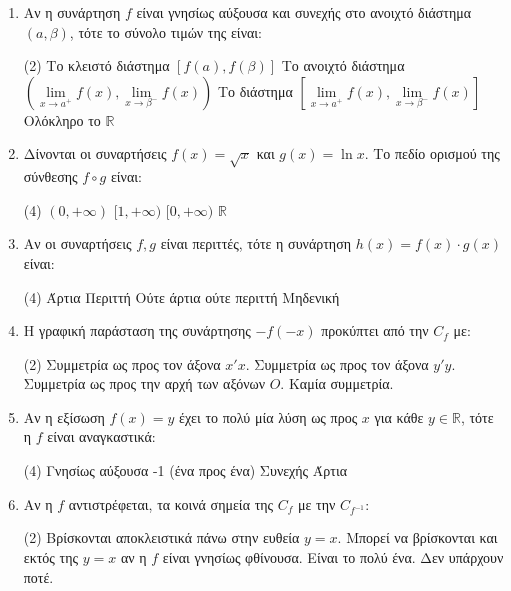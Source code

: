 \begin{enumerate}[label=\textbf{1.\arabic*.}, itemsep=4mm]
    \item Αν η συνάρτηση $f$ είναι γνησίως αύξουσα και συνεχής στο ανοιχτό διάστημα $(a, \beta)$, τότε το σύνολο τιμών της είναι:
    \begin{tasks}[label=\let\textdexiakeraia\relax\alph*.](2)
        \task Το κλειστό διάστημα $[f(a), f(\beta)]$
        \task Το ανοιχτό διάστημα $\left( \lim\limits_{x \to a^+} f(x), \lim\limits_{x \to \beta^-} f(x) \right)$
        \task Το διάστημα $\left[ \lim\limits_{x \to a^+} f(x), \lim\limits_{x \to \beta^-} f(x) \right]$
        \task Ολόκληρο το $\mathbb{R}$
    \end{tasks}

    \item Δίνονται οι συναρτήσεις $f(x) = \sqrt{x}$ και $g(x) = \ln x$. Το πεδίο ορισμού της σύνθεσης $f \circ g$ είναι:
    \begin{tasks}[label=\let\textdexiakeraia\relax\alph*.](4)
        \task $(0, +\infty)$
        \task $[1, +\infty)$
        \task $[0, +\infty)$
        \task $\mathbb{R}$
    \end{tasks}

    \item Αν οι συναρτήσεις $f, g$ είναι περιττές, τότε η συνάρτηση $h(x) = f(x) \cdot g(x)$ είναι:
    \begin{tasks}[label=\let\textdexiakeraia\relax\alph*.](4)
        \task Άρτια
        \task Περιττή
        \task Ούτε άρτια ούτε περιττή
        \task Μηδενική
    \end{tasks}

    \item Η γραφική παράσταση της συνάρτησης $-f(-x)$ προκύπτει από την $C_f$ με:
    \begin{tasks}[label=\let\textdexiakeraia\relax\alph*.](2)
        \task Συμμετρία ως προς τον άξονα $x'x$.
        \task Συμμετρία ως προς τον άξονα $y'y$.
        \task Συμμετρία ως προς την αρχή των αξόνων $O$.
        \task Καμία συμμετρία.
    \end{tasks}

    \item Αν η εξίσωση $f(x) = y$ έχει το πολύ μία λύση ως προς $x$ για κάθε $y \in \mathbb{R}$, τότε η $f$ είναι αναγκαστικά:
    \begin{tasks}[label=\let\textdexiakeraia\relax\alph*.](4)
        \task Γνησίως αύξουσα
        -1 (ένα προς ένα)
        \task Συνεχής
        \task Άρτια
    \end{tasks}

    \item Αν η $f$ αντιστρέφεται, τα κοινά σημεία της $C_f$ με την $C_{f^{-1}}$:
    \begin{tasks}[label=\let\textdexiakeraia\relax\alph*.](2)
        \task Βρίσκονται αποκλειστικά πάνω στην ευθεία $y=x$.
        \task Μπορεί να βρίσκονται και εκτός της $y=x$ αν η $f$ είναι γνησίως φθίνουσα.
        \task Είναι το πολύ ένα.
        \task Δεν υπάρχουν ποτέ.
    \end{tasks}


\end{enumerate}

